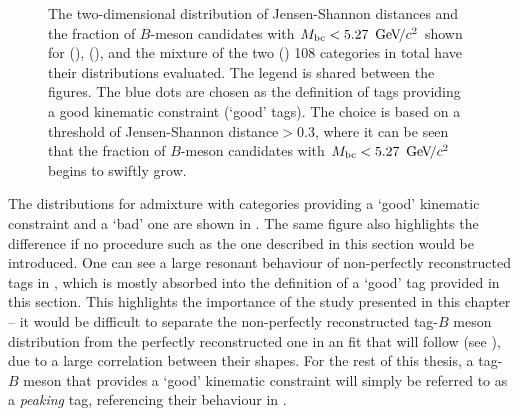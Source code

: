 \begin{figure}[htbp!]
    \centering
    \caption{\label{fig:good_tags_jsdists} The two-dimensional distribution of Jensen-Shannon distances and the fraction of $B$-meson candidates with ${M_{\mathrm{bc}}}<5.27~{\mathrm{\,Ge\kern -0.1em V\!/}c^2}$
    shown for \BptoXsgamma (), \BztoXsgamma (), and the mixture of the two ()
    108 categories in total have their \Mbc distributions evaluated.
    The legend is shared between the figures.
    The blue dots are chosen as the definition of tags providing a good kinematic constraint (`good' tags).
    The choice is based on a threshold of Jensen-Shannon distance$>0.3$, where it can be seen that the fraction of $B$-meson candidates with ${M_{\mathrm{bc}}}<5.27~{\mathrm{\,Ge\kern -0.1em V\!/}c^2}$ begins to swiftly grow.
    }
\end{figure}

The \Mbc distributions for \BtoXsgamma admixture with categories providing a `good' kinematic constraint and a `bad' one are shown in .
The same figure also highlights the difference if no procedure such as the one described in this section would be introduced.
One can see a large resonant behaviour of non-perfectly reconstructed tags in , which is mostly absorbed into the definition of a `good' tag provided in this section.
This highlights the importance of the study presented in this chapter -- it would be difficult to separate the non-perfectly reconstructed tag-$B$ meson distribution from the perfectly reconstructed one in an \Mbc fit that will follow (see ), due to a large correlation between their shapes.
For the rest of this thesis, a tag-$B$ meson that provides a `good' kinematic constraint will simply be referred to as a \textit{peaking} tag, referencing their behaviour in \Mbc.

